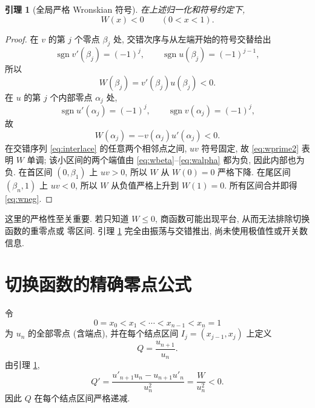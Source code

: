 \documentclass[UTF8]{ctexart}
\newtheorem{lemma}[theorem]{引理}
\begin{document}
\begin{lemma}[全局严格 Wronskian 符号]\label{lem:wneg}
在上述归一化和符号约定下,
\begin{equation}
	W(x)<0\qquad(0<x<1) .
	\label{eq:wneg}
\end{equation}
\end{lemma}

\begin{proof}
在 $v$ 的第 $j$ 个零点 $\beta_j$ 处, 交错次序与从左端开始的符号交替给出
\begin{equation*}
	\operatorname{sgn}v'(\beta_j)=(-1)^j,\qquad
	\operatorname{sgn}u(\beta_j)=(-1)^{j-1},
\end{equation*}
所以
\begin{equation}
	W(\beta_j)=v'(\beta_j)u(\beta_j)<0 .
	\label{eq:wbeta}
\end{equation}
在 $u$ 的第 $j$ 个内部零点 $\alpha_j$ 处,
\begin{equation*}
	\operatorname{sgn}u'(\alpha_j)=(-1)^j,\qquad
	\operatorname{sgn}v(\alpha_j)=(-1)^j,
\end{equation*}
故
\begin{equation}
	W(\alpha_j)=-v(\alpha_j)u'(\alpha_j)<0 .
	\label{eq:walpha}
\end{equation}
在交错序列 \eqref{eq:interlace} 的任意两个相邻点之间, $uv$ 符号固定, 故 \eqref{eq:wprime2}
表明 $W$ 单调; 该小区间的两个端值由 \eqref{eq:wbeta}--\eqref{eq:walpha} 都为负, 因此内部也为
负. 在首区间 $(0,\beta_1)$ 上 $uv>0$, 所以 $W$ 从 $W(0)=0$ 严格下降. 在尾区间 $(\beta_n,1)$ 上
$uv<0$, 所以 $W$ 从负值严格上升到 $W(1)=0$. 所有区间合并即得 \eqref{eq:wneg}.
\end{proof}

这里的严格性至关重要. 若只知道 $W\le0$, 商函数可能出现平台, 从而无法排除切换函数的重零点或
零区间. 引理 \ref{lem:wneg} 完全由振荡与交错推出, 尚未使用极值性或开关数信息.

\section{切换函数的精确零点公式}

令
\begin{equation*}
	0=x_0<x_1<\cdots<x_{n-1}<x_n=1
\end{equation*}
为 $u_n$ 的全部零点 (含端点), 并在每个结点区间 $I_j=(x_{j-1},x_j)$ 上定义
\begin{equation}
	Q=\frac{u_{n+1}}{u_n} .
	\label{eq:qdef}
\end{equation}
由引理 \ref{lem:wneg},
\begin{equation}
	Q'=\frac{u'_{n+1}u_n-u_{n+1}u'_n}{u_n^2}=\frac{W}{u_n^2}<0 .
	\label{eq:qprime}
\end{equation}
因此 $Q$ 在每个结点区间严格递减.
\end{document}
